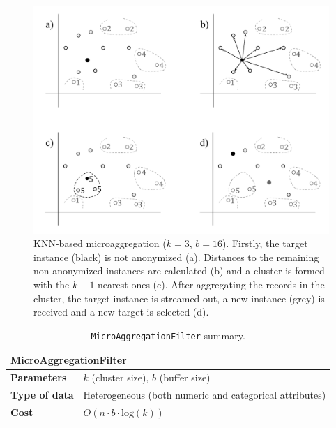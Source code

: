 \begin{figure}[h]
	\centering
	\includegraphics[width=.9\textwidth]{figures/microaggregation-schematic-2.pdf}
	\caption[KNN microaggregation, step by step.]{KNN-based microaggregation ($k = 3$, $b = 16$). Firstly, the target instance (black) is not anonymized (a). Distances to the remaining non-anonymized instances are calculated (b) and a cluster is formed with the $k-1$ nearest ones (c). After aggregating the records in the cluster, the target instance is streamed out, a new instance (grey) is received and a new target is selected (d).}
	\label{fig:microaggregation-schematic-2}
\end{figure}

\begin{table}[h]
	\centering
	\begin{tabular}{@{}ll@{}}
	\toprule
	\multicolumn{2}{l}{\textbf{MicroAggregationFilter}}                             \\ \midrule
	\textbf{Parameters}   & $k$ (cluster size), $b$ (buffer size)                   \\
	\textbf{Type of data} & Heterogeneous (both numeric and categorical attributes) \\
	\textbf{Cost}         & $O(n \cdot b \cdot \mathrm{log}(k))$                    \\ \bottomrule
	\end{tabular}
	\caption{\texttt{MicroAggregationFilter} summary.}
	\label{table:microaggregation-summary}
\end{table}